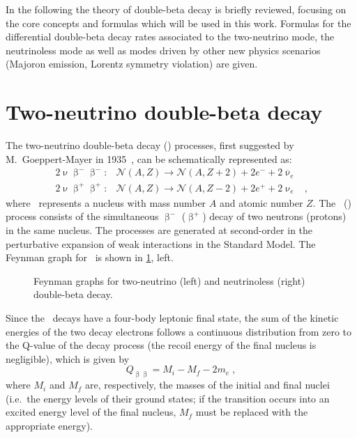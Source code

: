 In the following the theory of double-beta decay is briefly reviewed, focusing
on the core concepts and formulas which will be used in this work. Formulas for
the differential double-beta decay rates associated to the two-neutrino mode,
the neutrinoless mode as well as modes driven by other new physics scenarios
(Majoron emission, Lorentz symmetry violation) are given. 

\section{Two-neutrino double-beta decay}%
\label{sec:nbb:2nbb}

The two-neutrino double-beta decay (\nnbb) processes, first suggested by
M.~Goeppert-Mayer in 1935~\cite{GoeppertMayer1935}, can be schematically
represented as:
\[
  \begin{array}{llr}
    2\upnu\upbeta^-\upbeta^-: &
      \mathcal{N}(A,Z) \longrightarrow \mathcal{N}(A,Z+2)+2e^-+2{\overline \upnu}_e & \\
    2\upnu\upbeta^+\upbeta^+: &
      \mathcal{N}(A,Z) \longrightarrow \mathcal{N}(A,Z-2)+2e^++2\upnu_e &,
  \end{array}
\]
where \NAZ\ represents a nucleus with mass number $A$ and atomic number $Z$. The
\nnbbm\ (\nnbbp) process consists of the simultaneous $\upbeta^-$ ($\upbeta^+$)
decay of two neutrons (protons) in the same nucleus. The processes are
generated at second-order in the perturbative expansion of weak interactions in
the Standard Model. The Feynman graph for \nnbbm\ is shown in
\cref{fig:nbb:feydiag}, left.

\begin{figure}
  \centering%
  \caption{%
    Feynman graphs for two-neutrino (left) and neutrinoless (right) double-beta
    decay.
  }\label{fig:nbb:feydiag}
\end{figure}

Since the \nnbb\ decays have a four-body leptonic final state, the sum of the
kinetic energies of the two decay electrons follows a continuous distribution
from zero to the Q-value of the decay process (the recoil energy of the final
nucleus is negligible), which is given by
\[
  Q_{\upbeta\upbeta} = M_i - M_f - 2m_e \;,
\]
where $M_i$ and $M_f$ are, respectively, the masses of the initial and final
nuclei (i.e.~the energy levels of their ground states; if the transition occurs
into an excited energy level of the final nucleus, $M_f$ must be replaced with
the appropriate energy).

